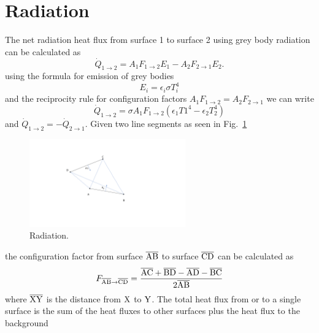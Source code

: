 \section{Radiation}
The net radiation heat flux from surface 1 to surface 2 using grey body radiation can be calculated as 
\begin{equation}
	\dot{Q}_{1 \rightarrow 2} = A_1 F_{1 \rightarrow 2} E_1 -  A_2 F_{2 \rightarrow 1} E_2.
\end{equation}
using the formula for emission of grey bodies
\begin{equation}
	E_i = \epsilon_i \sigma T_i^4 
\end{equation}
and the reciprocity rule for configuration factors $A_1 F_{1 \rightarrow 2} = A_2 F_{2 \rightarrow 1}$ we can write
\begin{equation}
	\dot{Q}_{1 \rightarrow 2} = \sigma A_1 F_{1 \rightarrow 2} \left(\epsilon_1 T1^4 - \epsilon_2 T_2^4\right)
\end{equation}
and $\dot{Q}_{1 \rightarrow 2} = -\dot{Q}_{2 \rightarrow 1}$.
Given two line segments as seen in Fig.~\ref{fig:radiation}
\begin{figure}[H]
	\centering
	\includegraphics[trim= 8cm 5cm 13cm 3.5cm ,clip,width=0.6\textwidth]{figures/radiation.png}
	\caption{Radiation.}
	\label{fig:radiation}
\end{figure}
the configuration factor from surface $\overline{\mathrm{AB}}$ to surface $\overline{\mathrm{CD}}$ can be calculated as
\begin{equation}
	F_{\overline{\mathrm{AB}} \rightarrow \overline{\mathrm{CD}}} = \frac{\overline{\mathrm{AC}} + \overline{\mathrm{BD}} - \overline{\mathrm{AD}} - \overline{\mathrm{BC}}}{2 \overline{\mathrm{AB}}}
\end{equation}
where $\overline{\mathrm{XY}}$ is the distance from $\mathrm{X}$ to $\mathrm{Y}$.
The total heat flux from or to a single surface is the sum of the heat fluxes to other surfaces plus the heat flux to the background
